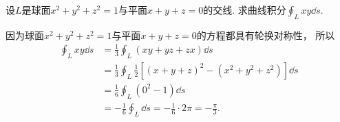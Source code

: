 \begin{example}
设\(L\)是球面\(x^2+y^2+z^2=1\)与平面\(x+y+z=0\)的交线.
求曲线积分\(\oint_L xy \dd{s}\).
\begin{solution}
因为球面\(x^2+y^2+z^2=1\)与平面\(x+y+z=0\)的方程都具有轮换对称性，
所以\begin{align*}
	\oint_L xy \dd{s}
	&= \frac13 \oint_L (xy+yz+zx) \dd{s} \\
	&= \frac13 \oint_L \frac12 [(x+y+z)^2 - (x^2+y^2+z^2)] \dd{s} \\
	&= \frac16 \oint_L (0^2 - 1) \dd{s} \\
	&= -\frac16 \oint_L \dd{s}
	= -\frac16 \cdot 2\pi
	= -\frac\pi3.
\end{align*}
\end{solution}
\end{example}
